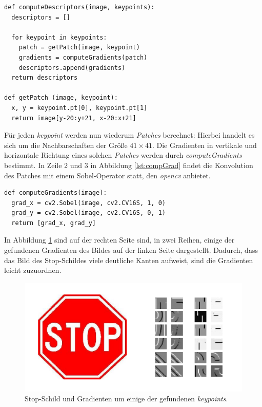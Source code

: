\lstset{language=Python}
\begin{lstlisting}
def computeDescriptors(image, keypoints):
  descriptors = []
  
  for keypoint in keypoints:
  	patch = getPatch(image, keypoint)
  	gradients = computeGradients(patch)
  	descriptors.append(gradients)
  return descriptors
  
def getPatch (image, keypoint):
  x, y = keypoint.pt[0], keypoint.pt[1]
  return image[y-20:y+21, x-20:x+21]
\end{lstlisting}

Für jeden \textit{keypoint} werden nun wiederum \textit{Patches} berechnet: Hierbei handelt es sich um die Nachbarschaften der Größe $41 \times 41$. Die Gradienten in vertikale und horizontale Richtung eines solchen \textit{Patches} werden durch \textit{computeGradients} bestimmt. In Zeile 2 und 3 in Abbildung \ref{lst:compGrad} findet die Konvolution des Patches mit einem Sobel-Operator statt, den \textit{opencv} anbietet.

\begin{lstlisting}
def computeGradients(image):
  grad_x = cv2.Sobel(image, cv2.CV16S, 1, 0)
  grad_y = cv2.Sobel(image, cv2.CV16S, 0, 1)
  return [grad_x, grad_y]
\end{lstlisting}

In Abbildung \ref{img:gradients} sind auf der rechten Seite sind, in zwei Reihen, einige der gefundenen Gradienten des Bildes auf der linken Seite dargestellt. Dadurch, dass das Bild des Stop-Schildes viele deutliche Kanten aufweist, sind die Gradienten leicht zuzuordnen.

\begin{figure}
	\centering
	\includegraphics[scale=0.65]{images/gradients_patch.png}
	\caption{Stop-Schild und Gradienten um einige der gefundenen \textit{keypoints}.}
	\label{img:gradients}
\end{figure}

